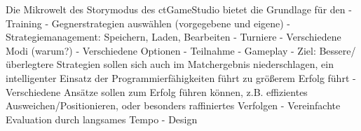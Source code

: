 Die Mikrowelt des Storymodus des ctGameStudio bietet die Grundlage für den
- Training
  - Gegnerstrategien auswählen (vorgegebene und eigene)
  - Strategiemanagement: Speichern, Laden, Bearbeiten
- Turniere
  - Verschiedene Modi (warum?)
  - Verschiedene Optionen
  - Teilnahme
- Gameplay
  - Ziel: Bessere/überlegtere Strategien sollen sich auch im Matchergebnis niederschlagen, ein intelligenter Einsatz der Programmierfähigkeiten führt zu größerem Erfolg führt
  - Verschiedene Ansätze sollen zum Erfolg führen können, z.B. effizientes Ausweichen/Positionieren, oder besonders raffiniertes Verfolgen
  - Vereinfachte Evaluation durch langsames Tempo
- Design

